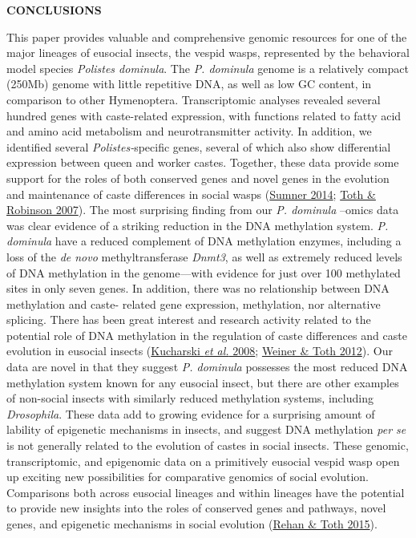 \documentclass[]{article}
\begin{document}
\textbf{CONCLUSIONS}

This paper provides valuable and comprehensive genomic resources for one
of the major lineages of eusocial insects, the vespid wasps, represented
by the behavioral model species \emph{Polistes dominula}. The \emph{P.
dominula} genome is a relatively compact (250Mb) genome with little
repetitive DNA, as well as low GC content, in comparison to other
Hymenoptera. Transcriptomic analyses revealed several hundred genes with
caste-related expression, with functions related to fatty acid and amino
acid metabolism and neurotransmitter activity. In addition, we
identified several \emph{Polistes-}specific genes, several of which also
show differential expression between queen and worker castes. Together,
these data provide some support for the roles of both conserved genes
and novel genes in the evolution and maintenance of caste differences in
social wasps (\protect\hyperlink{ux5fENREFux5f58}{Sumner 2014};
\protect\hyperlink{ux5fENREFux5f61}{Toth \& Robinson 2007}). The most
surprising finding from our \emph{P. dominula} --omics data was clear
evidence of a striking reduction in the DNA methylation system. \emph{P.
dominula} have a reduced complement of DNA methylation enzymes,
including a loss of the \emph{de novo} methyltransferase \emph{Dnmt3},
as well as extremely reduced levels of DNA methylation in the
genome---with evidence for just over 100 methylated sites in only seven
genes. In addition, there was no relationship between DNA methylation
and caste- related gene expression, methylation, nor alternative
splicing. There has been great interest and research activity related to
the potential role of DNA methylation in the regulation of caste
differences and caste evolution in eusocial insects
(\protect\hyperlink{ux5fENREFux5f28}{Kucharski \emph{et al.} 2008};
\protect\hyperlink{ux5fENREFux5f68}{Weiner \& Toth 2012}). Our data are
novel in that they suggest \emph{P. dominula} possesses the most reduced
DNA methylation system known for any eusocial insect, but there are
other examples of non-social insects with similarly reduced methylation
systems, including \emph{Drosophila}. These data add to growing evidence
for a surprising amount of lability of epigenetic mechanisms in insects,
and suggest DNA methylation \emph{per se} is not generally related to
the evolution of castes in social insects. These genomic,
transcriptomic, and epigenomic data on a primitively eusocial vespid
wasp open up exciting new possibilities for comparative genomics of
social evolution. Comparisons both across eusocial lineages and within
lineages have the potential to provide new insights into the roles of
conserved genes and pathways, novel genes, and epigenetic mechanisms in
social evolution (\protect\hyperlink{ux5fENREFux5f47}{Rehan \& Toth
2015}).
\end{document}
